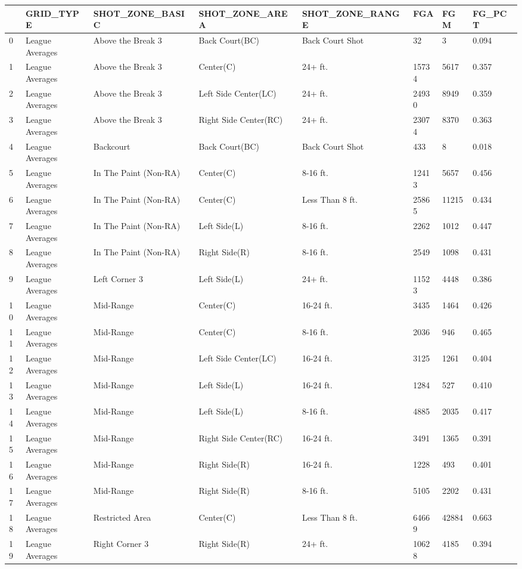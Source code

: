 \begin{longtable}[]{@{}llllllll@{}}
\toprule
& GRID\_TYPE & SHOT\_ZONE\_BASIC & SHOT\_ZONE\_AREA & SHOT\_ZONE\_RANGE
& FGA & FGM & FG\_PCT \\
\midrule
\endhead
0 & League Averages & Above the Break 3 & Back Court(BC) & Back Court
Shot & 32 & 3 & 0.094 \\
1 & League Averages & Above the Break 3 & Center(C) & 24+ ft. & 15734 &
5617 & 0.357 \\
2 & League Averages & Above the Break 3 & Left Side Center(LC) & 24+ ft.
& 24930 & 8949 & 0.359 \\
3 & League Averages & Above the Break 3 & Right Side Center(RC) & 24+
ft. & 23074 & 8370 & 0.363 \\
4 & League Averages & Backcourt & Back Court(BC) & Back Court Shot & 433
& 8 & 0.018 \\
5 & League Averages & In The Paint (Non-RA) & Center(C) & 8-16 ft. &
12413 & 5657 & 0.456 \\
6 & League Averages & In The Paint (Non-RA) & Center(C) & Less Than 8
ft. & 25865 & 11215 & 0.434 \\
7 & League Averages & In The Paint (Non-RA) & Left Side(L) & 8-16 ft. &
2262 & 1012 & 0.447 \\
8 & League Averages & In The Paint (Non-RA) & Right Side(R) & 8-16 ft. &
2549 & 1098 & 0.431 \\
9 & League Averages & Left Corner 3 & Left Side(L) & 24+ ft. & 11523 &
4448 & 0.386 \\
10 & League Averages & Mid-Range & Center(C) & 16-24 ft. & 3435 & 1464 &
0.426 \\
11 & League Averages & Mid-Range & Center(C) & 8-16 ft. & 2036 & 946 &
0.465 \\
12 & League Averages & Mid-Range & Left Side Center(LC) & 16-24 ft. &
3125 & 1261 & 0.404 \\
13 & League Averages & Mid-Range & Left Side(L) & 16-24 ft. & 1284 & 527
& 0.410 \\
14 & League Averages & Mid-Range & Left Side(L) & 8-16 ft. & 4885 & 2035
& 0.417 \\
15 & League Averages & Mid-Range & Right Side Center(RC) & 16-24 ft. &
3491 & 1365 & 0.391 \\
16 & League Averages & Mid-Range & Right Side(R) & 16-24 ft. & 1228 &
493 & 0.401 \\
17 & League Averages & Mid-Range & Right Side(R) & 8-16 ft. & 5105 &
2202 & 0.431 \\
18 & League Averages & Restricted Area & Center(C) & Less Than 8 ft. &
64669 & 42884 & 0.663 \\
19 & League Averages & Right Corner 3 & Right Side(R) & 24+ ft. & 10628
& 4185 & 0.394 \\
\bottomrule
\end{longtable}

